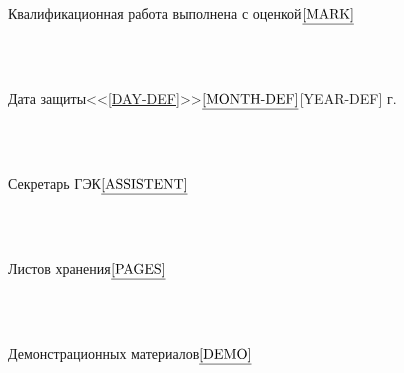 \documentclass[10pt]{article}
\begin{document}
~\\~\\Квалификационная работа выполнена с оценкой\qquad$\underset{}{\underline{\hspace{0\textwidth\text{[MARK]}}}}$

~\\~\\Дата защиты\qquad<<\underline{[DAY-DEF]}>>$\underset{}{\underline{\hspace{0\textwidth\text{[MONTH-DEF]}}}}$[YEAR-DEF] г.

~\\~\\Секретарь ГЭК\qquad$\underset{}{\underline{\hspace{0\textwidth\text{[ASSISTENT]}}}}$

~\\~\\Листов хранения\qquad$\underset{}{\underline{\hspace{0\textwidth\text{[PAGES]}}}}$

~\\~\\Демонстрационных материалов\qquad$\underset{}{\underline{\hspace{0\textwidth\text{[DEMO]}}}}$
\end{document}
